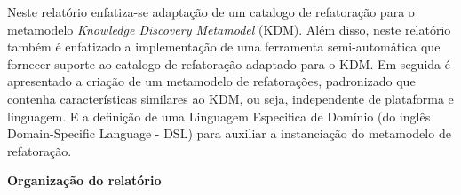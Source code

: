 Neste relatório enfatiza-se adaptação de um catalogo de refatoração para o metamodelo \textit{Knowledge Discovery Metamodel} (KDM). Além disso, neste relatório também é enfatizado a implementação de uma ferramenta semi-automática que fornecer suporte ao catalogo de refatoração adaptado para o KDM. Em seguida é apresentado a criação de um metamodelo de refatorações, padronizado que contenha características similares ao KDM, ou seja, independente de plataforma e linguagem. E a definição de uma Linguagem Especifica de Domínio (do inglês Domain-Specific Language - DSL) para auxiliar a instanciação do metamodelo de refatoração.

\textbf{Organização do relatório}
